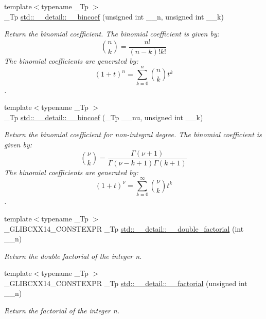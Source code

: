 \begin{DoxyCompactItemize}
{\footnotesize template$<$typename \+\_\+\+Tp $>$ }\\\+\_\+\+Tp \hyperlink{namespacestd_1_1____detail_ab0888bd3901e6501b1f451d6adcf967a}{std\+::\+\_\+\+\_\+detail\+::\+\_\+\+\_\+bincoef} (unsigned int \+\_\+\+\_\+n, unsigned int \+\_\+\+\_\+k)
\begin{DoxyCompactList}\small\item\em Return the binomial coefficient. The binomial coefficient is given by\+: \[ \binom{n}{k} = \frac{n!}{(n-k)! k!} \] The binomial coefficients are generated by\+: \[ \left(1 + t\right)^n = \sum_{k=0}^n \binom{n}{k} t^k \]. \end{DoxyCompactList}\item 
{\footnotesize template$<$typename \+\_\+\+Tp $>$ }\\\+\_\+\+Tp \hyperlink{namespacestd_1_1____detail_a537c9234f68801f2cdb60020cb98fbbd}{std\+::\+\_\+\+\_\+detail\+::\+\_\+\+\_\+bincoef} (\+\_\+\+Tp \+\_\+\+\_\+nu, unsigned int \+\_\+\+\_\+k)
\begin{DoxyCompactList}\small\item\em Return the binomial coefficient for non-\/integral degree. The binomial coefficient is given by\+: \[ \binom{\nu}{k} = \frac{\Gamma(\nu+1)}{\Gamma(\nu-k+1) \Gamma(k+1)} \] The binomial coefficients are generated by\+: \[ \left(1 + t\right)^\nu = \sum_{k=0}^\infty \binom{\nu}{k} t^k \]. \end{DoxyCompactList}\item 
{\footnotesize template$<$typename \+\_\+\+Tp $>$ }\\\+\_\+\+G\+L\+I\+B\+C\+X\+X14\+\_\+\+C\+O\+N\+S\+T\+E\+X\+PR \+\_\+\+Tp \hyperlink{namespacestd_1_1____detail_a06b0d9786afff0919c96f61d5f760c5f}{std\+::\+\_\+\+\_\+detail\+::\+\_\+\+\_\+double\+\_\+factorial} (int \+\_\+\+\_\+n)
\begin{DoxyCompactList}\small\item\em Return the double factorial of the integer n. \end{DoxyCompactList}\item 
{\footnotesize template$<$typename \+\_\+\+Tp $>$ }\\\+\_\+\+G\+L\+I\+B\+C\+X\+X14\+\_\+\+C\+O\+N\+S\+T\+E\+X\+PR \+\_\+\+Tp \hyperlink{namespacestd_1_1____detail_a8de5d6069cbef126684be0800f47f8b2}{std\+::\+\_\+\+\_\+detail\+::\+\_\+\+\_\+factorial} (unsigned int \+\_\+\+\_\+n)
\begin{DoxyCompactList}\small\item\em Return the factorial of the integer n. \end{DoxyCompactList}\item 

\end{DoxyCompactItemize}
